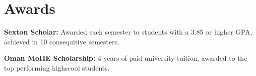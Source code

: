 \documentclass[letterpaper,11pt]{article}
\begin{document}
\section{Awards}
 \begin{itemize}[leftmargin=0.15in, label={}]
    \small{\item{
   
     \textbf{Sexton Scholar:}{ Awarded each semester to students with a 3.85 or higher GPA, achieved in 10 consequitive semesters.}
    
    \textbf{Oman MoHE Scholarship:}{ 4 years of paid university tuition, awarded to the top performing highscool students.}
    }}
 \end{itemize}



\end{document}
